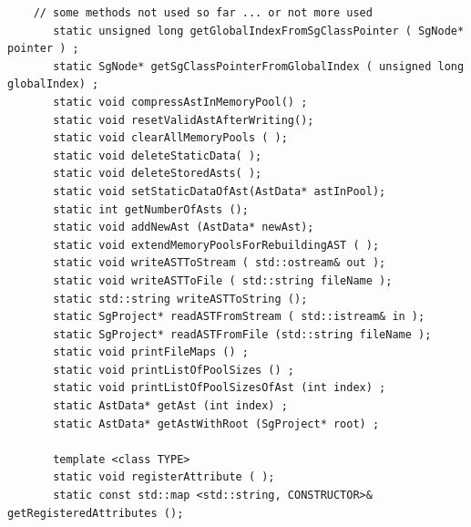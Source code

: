\begin{enumerate}
\begin{lstlisting}
    // some methods not used so far ... or not more used   
       static unsigned long getGlobalIndexFromSgClassPointer ( SgNode* pointer ) ;
       static SgNode* getSgClassPointerFromGlobalIndex ( unsigned long globalIndex) ;
       static void compressAstInMemoryPool() ;
       static void resetValidAstAfterWriting();
       static void clearAllMemoryPools ( );
       static void deleteStaticData( );
       static void deleteStoredAsts( );
       static void setStaticDataOfAst(AstData* astInPool);
       static int getNumberOfAsts ();
       static void addNewAst (AstData* newAst);
       static void extendMemoryPoolsForRebuildingAST ( );
       static void writeASTToStream ( std::ostream& out );
       static void writeASTToFile ( std::string fileName );
       static std::string writeASTToString ();
       static SgProject* readASTFromStream ( std::istream& in );
       static SgProject* readASTFromFile (std::string fileName );
       static void printFileMaps () ;
       static void printListOfPoolSizes () ;
       static void printListOfPoolSizesOfAst (int index) ;
       static AstData* getAst (int index) ;
       static AstData* getAstWithRoot (SgProject* root) ;

       template <class TYPE>
       static void registerAttribute ( ); 
       static const std::map <std::string, CONSTRUCTOR>& getRegisteredAttributes ();

         \end{lstlisting}

\end{enumerate}

